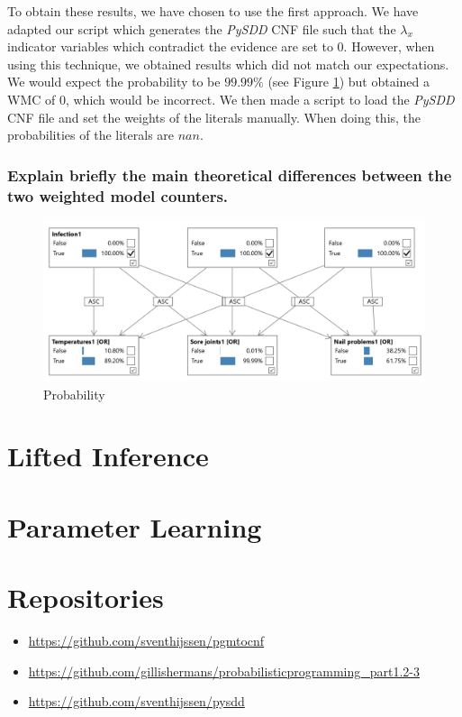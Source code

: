 \documentclass{article}
\begin{document}
To obtain these results, we have chosen to use the first approach. We have adapted our script which generates the \textit{PySDD} CNF file such that the $\lambda_x$ indicator variables which contradict the evidence are set to 0. However, when using this technique, we obtained results which did not match our expectations. We would expect the probability to be $99.99\%$ (see Figure \ref{fig:task_1_3_4}) but obtained a WMC of 0, which would be incorrect. We then made a script to load the \textit{PySDD} CNF file and set the weights of the literals manually. When doing this, the probabilities of the literals are $nan$.

\subsubsection{Explain briefly the main theoretical differences between the two weighted model counters.}


\begin{figure}[h]
	\centering
	\includegraphics[width=\linewidth]{images/task_1_3_4.png}
	\caption{Probability}
	\label{fig:task_1_3_4}
\end{figure}

\section{Lifted Inference}
\section{Parameter Learning}

\newpage


\section*{Repositories}
\begin{itemize}
	\item \href{https://github.com/sventhijssen/pgmtocnf}{https://github.com/sventhijssen/pgmtocnf}
	\item \href{https://github.com/gillishermans/probabilisticprogramming_part1.2-3}{https://github.com/gillishermans/probabilisticprogramming\_part1.2-3}
	\item \href{https://github.com/sventhijssen/pysdd}{https://github.com/sventhijssen/pysdd}
\end{itemize}
\end{document}
